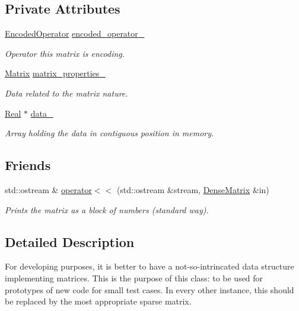 \subsection*{Private Attributes}
\begin{DoxyCompactItemize}
\item 
\hyperlink{group__c02-enums_ga9b50023bfb2692219d2915feade94f80}{Encoded\+Operator} \hyperlink{classmtk_1_1DenseMatrix_ad1633ffc35da862b5284d3907ab5175a}{encoded\+\_\+operator\+\_\+}
\begin{DoxyCompactList}\small\item\em Operator this matrix is encoding. \end{DoxyCompactList}\item 
\hyperlink{classmtk_1_1Matrix}{Matrix} \hyperlink{classmtk_1_1DenseMatrix_a481c8d09af685a5ba67acefdcaa810cc}{matrix\+\_\+properties\+\_\+}
\begin{DoxyCompactList}\small\item\em Data related to the matrix nature. \end{DoxyCompactList}\item 
\hyperlink{group__c01-roots_gac080bbbf5cbb5502c9f00405f894857d}{Real} $\ast$ \hyperlink{classmtk_1_1DenseMatrix_a7893e4e5c8d2e2de32b156177e78cb6f}{data\+\_\+}
\begin{DoxyCompactList}\small\item\em Array holding the data in contiguous position in memory. \end{DoxyCompactList}\end{DoxyCompactItemize}
\subsection*{Friends}
\begin{DoxyCompactItemize}
\item 
std\+::ostream \& \hyperlink{classmtk_1_1DenseMatrix_adbcc850ef373550f634f563573a31d28}{operator$<$$<$} (std\+::ostream \&stream, \hyperlink{classmtk_1_1DenseMatrix}{Dense\+Matrix} \&in)
\begin{DoxyCompactList}\small\item\em Prints the matrix as a block of numbers (standard way). \end{DoxyCompactList}\end{DoxyCompactItemize}


\subsection{Detailed Description}
For developing purposes, it is better to have a not-\/so-\/intrincated data structure implementing matrices. This is the purpose of this class\+: to be used for prototypes of new code for small test cases. In every other instance, this should be replaced by the most appropriate sparse matrix. 

